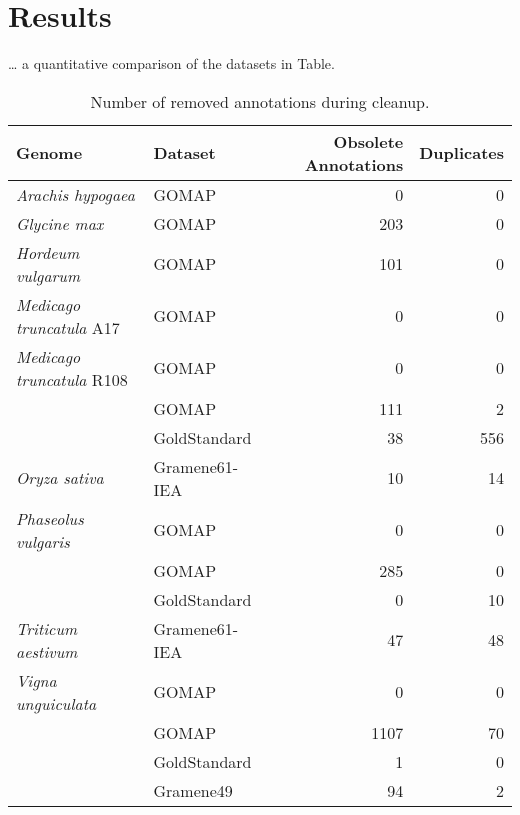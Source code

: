 \documentclass[utf8]{frontiersSCNS}
\begin{document}
\hypertarget{results}{%
\section{Results}\label{results}}

\ldots{} a quantitative comparison of the datasets in Table.

\begin{table}[t]

\caption{\label{tab:cleanup-table}Number of removed annotations during cleanup.}
\centering
\begin{tabular}{llrr}
\toprule
Genome & Dataset & Obsolete Annotations & Duplicates\\
\midrule
\rowcolor{gray!6}  \textit{Arachis hypogaea} & GOMAP & 0 & 0\\
\cmidrule{1-4}
\textit{Glycine max} & GOMAP & 203 & 0\\
\cmidrule{1-4}
\rowcolor{gray!6}  \textit{Hordeum vulgarum} & GOMAP & 101 & 0\\
\cmidrule{1-4}
\textit{Medicago truncatula} A17 & GOMAP & 0 & 0\\
\cmidrule{1-4}
\rowcolor{gray!6}  \textit{Medicago truncatula} R108 & GOMAP & 0 & 0\\
\cmidrule{1-4}
 & GOMAP & 111 & 2\\

\rowcolor{gray!6}   & GoldStandard & 38 & 556\\

\multirow{-3}{*}{\raggedright\arraybackslash \textit{Oryza sativa}} & Gramene61-IEA & 10 & 14\\
\cmidrule{1-4}
\rowcolor{gray!6}  \textit{Phaseolus vulgaris} & GOMAP & 0 & 0\\
\cmidrule{1-4}
 & GOMAP & 285 & 0\\

\rowcolor{gray!6}   & GoldStandard & 0 & 10\\

\multirow{-3}{*}{\raggedright\arraybackslash \textit{Triticum aestivum}} & Gramene61-IEA & 47 & 48\\
\cmidrule{1-4}
\rowcolor{gray!6}  \textit{Vigna unguiculata} & GOMAP & 0 & 0\\
\cmidrule{1-4}
 & GOMAP & 1107 & 70\\

\rowcolor{gray!6}   & GoldStandard & 1 & 0\\

 & Gramene49 & 94 & 2\\


\end{tabular}
\end{table}
\end{document}
